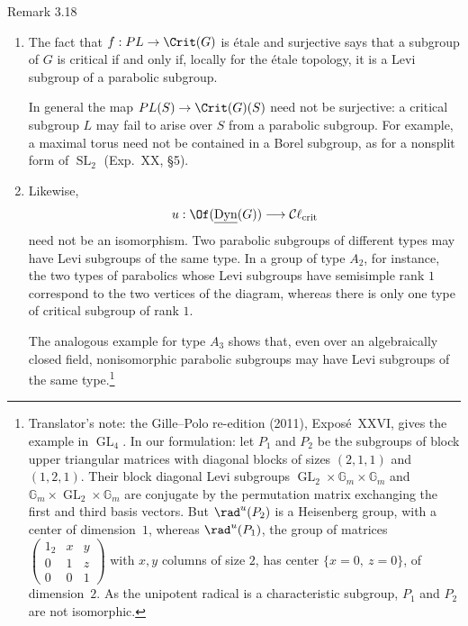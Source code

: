 \begin{sgastatement}{Remark 3.18}
\begin{enumerate}[label=\textup{(\roman*)}]
\item The fact that \(f:PL\to\Crit(G)\) is étale and surjective says that
a subgroup of \(G\) is critical if and only if, locally for the étale
topology, it is a Levi subgroup of a parabolic subgroup.

In general the map \(PL(S)\to\Crit(G)(S)\) need not be surjective: a
critical subgroup \(L\) may fail to arise over \(S\) from a parabolic
subgroup.  For example, a maximal torus need not be contained in a Borel
subgroup, as for a nonsplit form of \(\operatorname{SL}_2\)
\textup{(Exp.\ XX, §5)}.
\item Likewise,
\[
 u:\Of(\underline{\operatorname{Dyn}}(G))
 \longrightarrow\mathcal C\ell_{\mathrm{crit}}
\]
need not be an isomorphism.  Two parabolic subgroups of different types
may have Levi subgroups of the same type.  In a group of type \(A_2\),
for instance, the two types of parabolics whose Levi subgroups have
semisimple rank \(1\) correspond to the two vertices of the diagram,
whereas there is only one type of critical subgroup of rank \(1\).

The analogous example for type \(A_3\) shows that, even over an
algebraically closed field, nonisomorphic parabolic subgroups may have
Levi subgroups of the same type.\footnote{Translator's note: the Gille--Polo re-edition (2011), Exposé~XXVI, gives
the example in \(\operatorname{GL}_4\). In our formulation: let \(P_1\) and
\(P_2\) be the subgroups of block upper triangular matrices with diagonal
blocks of sizes \((2,1,1)\) and \((1,2,1)\). Their block diagonal Levi
subgroups \(\operatorname{GL}_2\times\mathbb G_m\times\mathbb G_m\) and
\(\mathbb G_m\times\operatorname{GL}_2\times\mathbb G_m\) are conjugate by the
permutation matrix exchanging the first and third basis vectors. But
\(\rad^u(P_2)\) is a Heisenberg group, with a center of dimension~\(1\),
whereas \(\rad^u(P_1)\), the group of matrices
\(\left(\begin{smallmatrix}1_2&x&y\\0&1&z\\0&0&1\end{smallmatrix}\right)\)
with \(x,y\) columns of size \(2\), has center \(\{x=0,\ z=0\}\), of
dimension~\(2\). As the unipotent radical is a characteristic subgroup,
\(P_1\) and \(P_2\) are not isomorphic.}
\end{enumerate}
\end{sgastatement}

